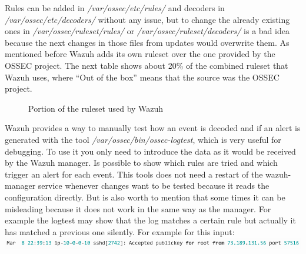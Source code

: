 \linej
\linej
Rules can be added in \textit{/var/ossec/etc/rules/} and decoders in \textit{/var/ossec/etc/decoders/} without any issue, but to change the already existing ones in \textit{/var/ossec/ruleset/rules/} or \textit{/var/ossec/ruleset/decoders/} is a bad idea because the next changes in those files from updates would overwrite them.
\linej
\linej
As mentioned before Wazuh adds its own ruleset over the one provided by the OSSEC project. The next table shows about 20\% of the combined ruleset that Wazuh uses, where ``Out of the box'' means that the source was the OSSEC project.
\begin{figure}[H]
  \centering
	\caption{Portion of the ruleset used by Wazuh\cite{wazuh_ossec_ruleset}}
\end{figure}
\linej
Wazuh provides a way to manually test how an event is decoded and if an alert is generated with the tool \textit{/var/ossec/bin/ossec-logtest}\cite{wazuh_testing}, which is very useful for debugging.
To use it you only need to introduce the data as it would be received by the Wazuh manager.
Is possible to show which rules are tried and which trigger an alert for each event.
This tools does not need a restart of the wazuh-manager service whenever changes want to be tested because it reads the configuration directly.
\linej
But is also worth to mention that some times it can be misleading because it does not work in the same way as the manager.
For example the logtest may show that the log matches a certain rule but actually it has matched a previous one silently.
\linej
\linej
For example for this input:
\linej
\includegraphics[width=\textwidth]{figuras/ossec-logtest_input.png}

